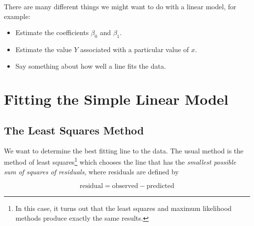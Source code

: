 \documentclass[twoside]{book}\usepackage[]{graphicx}\usepackage[]{xcolor}
\newcounter{example}[section]
\begin{document}
There are many different things we might want to do with a linear model, for example:
\begin{itemize}
	\item Estimate the coefficients $\beta_0$ and $\beta_1$.
	\item Estimate the value $Y$ associated with a particular value of $x$.
	\item Say something about how well a line fits the data.
\end{itemize}

\section{Fitting the Simple Linear Model}

\subsection{The Least Squares Method}

We want to determine the best fitting line to the data.  The usual method is 
the method of least squares\footnote{In this case, it turns out that the least 
squares and maximum likelihood methods produce exactly the same results.}
which chooses the line that has the 
\emph{ smallest possible sum of squares of residuals}, where residuals are defined by

\[
\mbox{residual} = \mbox{observed} - \mbox{predicted}
\]
\end{document}
